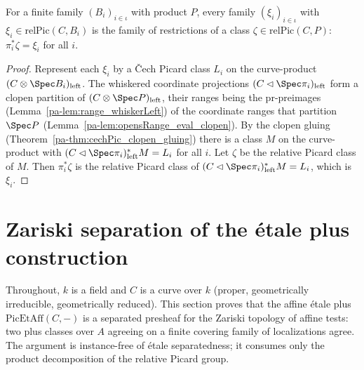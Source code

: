 \begin{theorem}
  \label{pa-thm:relPic_pi_gluing}
  \leanok

  For a finite family \((B_i)_{i \in \iota}\) with product \(P\), every family
  \((\xi_i)_{i \in \iota}\) with \(\xi_i \in \mathrm{relPic}(C, B_i)\) is the family of restrictions
  of a class \(\zeta \in \mathrm{relPic}(C, P)\): \(\pi_i^{*}\zeta = \xi_i\) for all \(i\).
\end{theorem}
\begin{proof}
  \leanok
  Represent each \(\xi_i\) by a \v Cech Picard class \(L_i\) on the curve-product
  \((C \otimes \Spec B_i)_{\mathrm{left}}\). The whiskered coordinate projections
  \((C \lhd \Spec\pi_i)_{\mathrm{left}}\) form a clopen partition of
  \((C \otimes \Spec P)_{\mathrm{left}}\), their ranges being the \(\mathrm{pr}\)-preimages
  (Lemma~\ref{pa-lem:range_whiskerLeft}) of the coordinate ranges that partition \(\Spec P\)
  (Lemma~\ref{pa-lem:opensRange_eval_clopen}). By the clopen gluing
  (Theorem~\ref{pa-thm:cechPic_clopen_gluing}) there is a class \(M\) on the curve-product with
  \((C \lhd \Spec\pi_i)_{\mathrm{left}}^{*} M = L_i\) for all \(i\). Let \(\zeta\) be the relative
  Picard class of \(M\). Then \(\pi_i^{*}\zeta\) is the relative Picard class of
  \((C \lhd \Spec\pi_i)_{\mathrm{left}}^{*} M = L_i\), which is \(\xi_i\).
\end{proof}

\section{Zariski separation of the \'etale plus construction}

Throughout, \(k\) is a field and \(C\) is a curve over \(k\) (proper, geometrically irreducible,
geometrically reduced). This section proves that the affine \'etale plus \(\mathrm{PicEtAff}(C, -)\)
is a separated presheaf for the Zariski topology of affine tests: two plus classes over \(A\)
agreeing on a finite covering family of localizations agree. The argument is instance-free of
\'etale separatedness; it consumes only the product decomposition of the relative Picard group.

